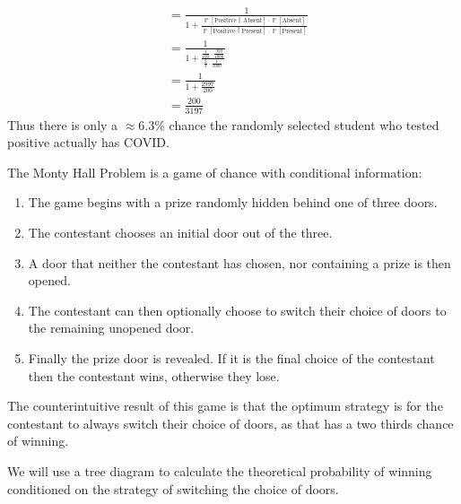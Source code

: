 \documentclass[answers]{exam}
\begin{document}
\begin{questions}
\begin{solution}
\begin{align*}
                \\ & =
                \frac{1}{1 + \frac{\operatorname{\mathbb{P}}\left[ \text{Positive} \middle\| \text{Absent} \right] \cdot \operatorname{\mathbb{P}}\left[ \text{Absent} \right]}{\operatorname{\mathbb{P}}\left[ \text{Positive} \middle\| \text{Present} \right] \cdot \operatorname{\mathbb{P}}\left[ \text{Present} \right]}}
                \\ & =
                \frac{1}{1 + \frac{\frac{1}{100} \cdot \frac{999}{1000}}{\frac{2}{3} \cdot \frac{1}{1000}}}
                \\ & =
                \frac{1}{1 + \frac{2997}{200}}
                \\ & =
                \frac{200}{3197}
            \end{align*}
            Thus there is only a ${\approx}6.3\%$ chance the randomly selected student who
            tested positive actually has COVID.
        \end{solution}
        \textbf{\thequestiontitle}

        The Monty Hall Problem is a game of chance with conditional information:
        \begin{enumerate}
            \item The game begins with a prize randomly hidden behind one of three doors.
            \item The contestant chooses an initial door out of the three.
            \item A door that neither the contestant has chosen, nor containing a prize is
            then opened.
            \item The contestant can then optionally choose to switch their choice of doors
            to the remaining unopened door.
            \item Finally the prize door is revealed. If it is the final choice of the
            contestant then the contestant wins, otherwise they lose.
        \end{enumerate}
        The counterintuitive result of this game is that the optimum strategy is for the
        contestant to always switch their choice of doors, as that has a two thirds chance
        of winning.
        \begin{solution}
            We will use a tree diagram to calculate the theoretical probability of winning
            conditioned on the strategy of switching the choice of doors.


\end{solution}
\end{questions}
\end{document}
